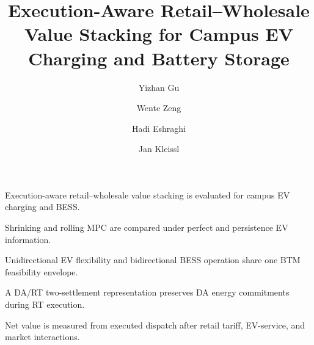 \documentclass[final,5p,times]{elsarticle}
\begin{document}
\begin{frontmatter}

\title{Execution-Aware Retail--Wholesale Value Stacking for Campus EV Charging and Battery Storage}

\author[ucsd]{Yizhan Gu}
\author[totalenergies]{Wente Zeng}
\author[totalenergies]{Hadi Eshraghi}
\author[ucsd]{Jan Kleissl}



\begin{highlights}
\item Execution-aware retail--wholesale value stacking is evaluated for campus EV charging and BESS.
\item Shrinking and rolling MPC are compared under perfect and persistence EV information.
\item Unidirectional EV flexibility and bidirectional BESS operation share one BTM feasibility envelope.
\item A DA/RT two-settlement representation preserves DA energy commitments during RT execution.
\item Net value is measured from executed dispatch after retail tariff, EV-service, and market interactions.
\end{highlights}


\end{frontmatter}
\end{document}
